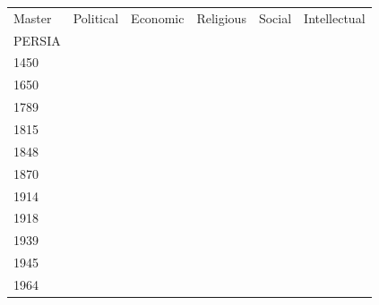 \documentclass[12pt]{article}
\begin{document}
\begin{enumerate}
\begin{tabular}{|l|l|l|l|l|l|}
\end{tabular}

\begin{tabular}{|l|l|l|l|l|l|}

\hline
Master & Political & Economic & Religious & Social & Intellectual\\
PERSIA & & & & & \\
\hline
1450 & & & & & \\
\hline
1650 & & & & & \\
\hline
1789 & & & & & \\
\hline
1815 & & & & & \\
\hline
1848 & & & & & \\
\hline
1870 & & & & & \\
\hline
1914 & & & & & \\
\hline
1918 & & & & & \\
\hline
1939 & & & & & \\
\hline
1945 & & & & & \\
\hline
1964 & & & & & \\
\hline



\end{tabular}

\end{enumerate}
\end{document}
